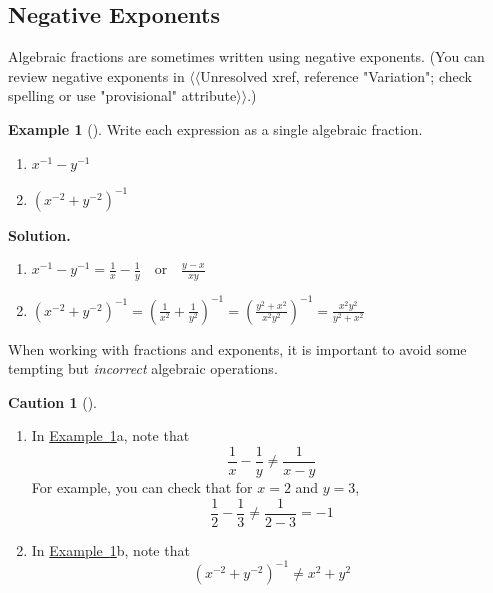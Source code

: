 \documentclass[10pt,]{book}
\theoremstyle{plain}
\theoremstyle{definition}
\newtheorem{warning}[theorem]{Caution}
\theoremstyle{definition}
\newtheorem{example}[theorem]{Example}
\theoremstyle{definition}
\numberwithin{equation}{part}
\begin{document}
\subsection[{Negative Exponents}]{Negative Exponents}\label{subsection-42}
Algebraic fractions are sometimes written using negative exponents. (You can review negative exponents in {$\langle\langle$Unresolved xref, reference "Variation"; check spelling or use "provisional" attribute$\rangle\rangle$}.)%
\begin{example}[]\label{example-negative-exponents-complex-fractions}
Write each expression as a single algebraic fraction. \leavevmode%
\begin{enumerate}[label=*\alph**]
\item\hypertarget{li-324}{}\(x^{-1}-y^{-1}\)%
\item\hypertarget{li-325}{}\(\left(x^{-2}+y^{-2}\right)^{-1}\)%
\end{enumerate}
%
\par\medskip\noindent%
\textbf{Solution.}\quad \leavevmode%
\begin{enumerate}[label=*\alph**]
\item\hypertarget{li-326}{}\(\displaystyle{x^{-1}-y^{-1}=\frac{1}{x}-\frac{1}{y} ~~~\text{ or } ~~~\frac{y-x}{xy}}\)%
\item\hypertarget{li-327}{}\(\displaystyle{\left(x^{-2}+y^{-2}\right)^{-1}=\left(\frac{1}{x^{2}}+\frac{1}{y^{2}}\right)^{-1}
=\left(\frac{y^{2}+x^{2}}{x^2y^2}\right)^{-1}=\frac{x^2y^2}{y^2+x^2}}\)%
\end{enumerate}
%
\end{example}
\par
When working with fractions and exponents, it is important to avoid some tempting but \emph{incorrect} algebraic operations.%
\begin{warning}[]\label{warning-13}
\leavevmode%
\begin{enumerate}[label=*\arabic**]
\item\hypertarget{li-328}{}In \hyperref[example-negative-exponents-complex-fractions]{Example~\ref{example-negative-exponents-complex-fractions}}a, note that%
\begin{equation*}
\frac{1}{x}-\frac{1}{y}\ne\frac{1}{x-y} 
\end{equation*}
For example, you can check that for \(x=2\) and \(y=3\),%
\begin{equation*}
\frac{1}{2}-\frac{1}{3}\ne\frac{1}{2-3}=-1 
\end{equation*}
%
\item\hypertarget{li-329}{}In \hyperref[example-negative-exponents-complex-fractions]{Example~\ref{example-negative-exponents-complex-fractions}}b, note that%
\begin{equation*}
\left(x^{-2}+y^{-2}\right)^{-1}\ne x^2+y^2
\end{equation*}
%
\end{enumerate}
%
\end{warning}
\end{document}

